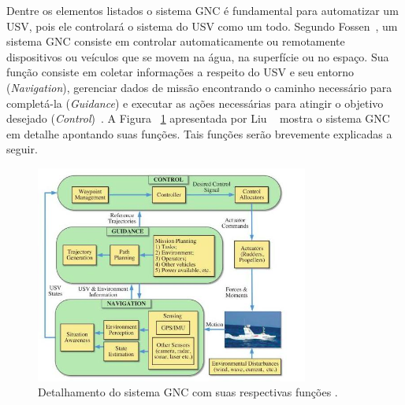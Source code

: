         Dentre os elementos listados o sistema GNC é fundamental para automatizar um USV, pois ele controlará o sistema do USV como um todo. Segundo Fossen~\cite{Fossen2011Handbook}, um sistema GNC consiste em controlar automaticamente ou remotamente dispositivos ou veículos que se movem na água, na superfície ou no espaço. Sua função consiste em coletar informações a respeito do USV e seu entorno (\textit{Navigation}), gerenciar dados de missão encontrando o caminho necessário para completá-la (\textit{Guidance}) e executar as ações necessárias para atingir o objetivo desejado (\textit{Control})~\cite{LIU201671}. A Figura ~\ref{fig:Liu2016_gncSystem} apresentada por Liu \etal~\cite{LIU201671} mostra o sistema GNC em detalhe apontando suas funções. Tais funções serão brevemente explicadas a seguir.
        
        \begin{figure}
            \centering
            \includegraphics[width=0.8\textwidth]{fig/chap2/gnc_system.png}
            \caption{Detalhamento do sistema GNC com suas respectivas funções \cite{LIU201671}.}
            \label{fig:Liu2016_gncSystem}
        \end{figure}
        

